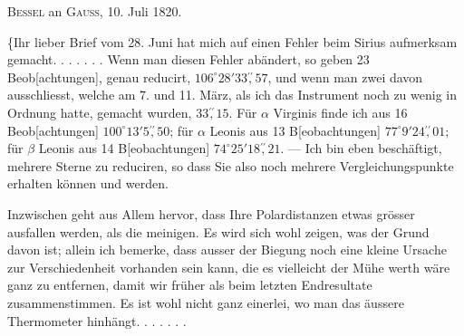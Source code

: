 \clearpage\begingroup
\hypertarget{native-331b}{}
\begin{center}\textsc{Bessel} an \textsc{Gauss}, 10. Juli 1820.\end{center}
\noindent\hspace*{\parindent}\{Ihr lieber Brief vom 28. Juni hat mich auf einen Fehler beim Sirius aufmerksam gemacht. . . . . . . Wenn man diesen Fehler abändert, so geben 23 Beob[achtungen], genau reducirt, \(106^\circ28'33\overset{\prime\prime}{,}57\), und wenn man zwei davon ausschliesst, welche am 7. und 11. März, als ich das Instrument noch zu wenig in Ordnung hatte, gemacht wurden, \(33\overset{\prime\prime}{,}15\). Für \(\alpha\) Virginis finde ich aus 16 Beob[achtungen] \(100^\circ13'5\overset{\prime\prime}{,}50\); für \(\alpha\) Leonis aus 13 B[eobachtungen] \(77^\circ9'24\overset{\prime\prime}{,}01\); für \(\beta\) Leonis aus 14 B[eobachtungen] \(74^\circ25'18\overset{\prime\prime}{,}21\). — Ich bin eben beschäftigt, mehrere Sterne zu reduciren, so dass Sie also noch mehrere Vergleichungspunkte erhalten können und werden.

Inzwischen geht aus Allem hervor, dass Ihre Polardistanzen etwas grösser ausfallen werden, als die meinigen. Es wird sich wohl zeigen, was der Grund davon ist; allein ich bemerke, dass ausser der Biegung noch eine kleine Ursache zur Verschiedenheit vorhanden sein kann, die es vielleicht der Mühe werth wäre ganz zu entfernen, damit wir früher als beim letzten Endresultate  zusammenstimmen. Es ist wohl nicht ganz einerlei, wo man das äussere Thermometer hinhängt. . . . . . .

